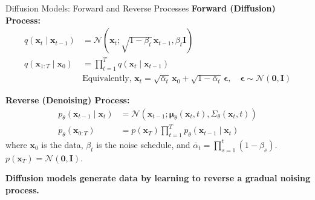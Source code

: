 \begin{refsection}
\begin{frame}{Diffusion Models: Forward and Reverse Processes}
  \footnotesize
  \textbf{Forward (Diffusion) Process:}
  \begin{align*}
    q(\mathbf{x}_t \mid \mathbf{x}_{t-1}) &= \mathcal{N}(\mathbf{x}_t; \sqrt{1-\beta_t}\,\mathbf{x}_{t-1}, \beta_t \mathbf{I}) \\
    q(\mathbf{x}_{1:T} \mid \mathbf{x}_0) &= \prod_{t=1}^T q(\mathbf{x}_t \mid \mathbf{x}_{t-1}) \\
    &\text{Equivalently,  } 
    \mathbf{x}_t = \sqrt{\bar{\alpha}_t}\,\mathbf{x}_0 + \sqrt{1-\bar{\alpha}_t}\,\boldsymbol{\epsilon}, \quad \boldsymbol{\epsilon} \sim \mathcal{N}(\mathbf{0}, \mathbf{I})
  \end{align*}

  \footnotesize
  \textbf{Reverse (Denoising) Process:}
  \begin{align*}
    p_\theta(\mathbf{x}_{t-1} \mid \mathbf{x}_t) &= \mathcal{N}(\mathbf{x}_{t-1}; \boldsymbol{\mu}_\theta(\mathbf{x}_t, t), \Sigma_\theta(\mathbf{x}_t, t)) \\
    p_\theta(\mathbf{x}_{0:T}) &= p(\mathbf{x}_T) \prod_{t=1}^T p_\theta(\mathbf{x}_{t-1} \mid \mathbf{x}_t)
  \end{align*}
  \scriptsize
  where $\mathbf{x}_0$ is the data, $\beta_t$ is the noise schedule, and $\bar{\alpha}_t = \prod_{s=1}^t (1-\beta_s)$. $p(\mathbf{x}_T) = \mathcal{N}(\mathbf{0}, \mathbf{I})$.

  \scriptsize
  \textbf{Diffusion models generate data by learning to reverse a gradual noising process.}~\parencite{sohl2015deep,ho2020denoising}
  \bottomleftrefs
\end{frame}
\end{refsection}

